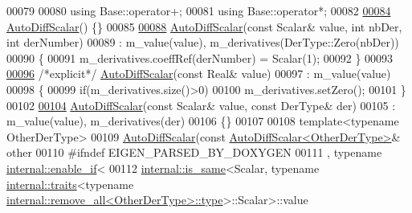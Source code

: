 \begin{DoxyCode}
00079 
00080     \textcolor{keyword}{using} Base::operator+;
00081     \textcolor{keyword}{using} Base::operator*;
00082 
\hyperlink{class_eigen_1_1_auto_diff_scalar_ae73d362745e986c00cee5658bf731412}{00084}     \hyperlink{class_eigen_1_1_auto_diff_scalar_ae73d362745e986c00cee5658bf731412}{AutoDiffScalar}() \{\}
00085 
\hyperlink{class_eigen_1_1_auto_diff_scalar_a7f4f44f682ba5d500c34c4f2fa6ecb9e}{00088}     \hyperlink{class_eigen_1_1_auto_diff_scalar_a7f4f44f682ba5d500c34c4f2fa6ecb9e}{AutoDiffScalar}(\textcolor{keyword}{const} Scalar& value, \textcolor{keywordtype}{int} nbDer, \textcolor{keywordtype}{int} derNumber)
00089       : m\_value(value), m\_derivatives(DerType::Zero(nbDer))
00090     \{
00091       m\_derivatives.coeffRef(derNumber) = Scalar(1);
00092     \}
00093 
\hyperlink{class_eigen_1_1_auto_diff_scalar_a14e0f5ecc595deb05aaf336f5a81b861}{00096}     \textcolor{comment}{/*explicit*/} \hyperlink{class_eigen_1_1_auto_diff_scalar_a14e0f5ecc595deb05aaf336f5a81b861}{AutoDiffScalar}(\textcolor{keyword}{const} Real& value)
00097       : m\_value(value)
00098     \{
00099       \textcolor{keywordflow}{if}(m\_derivatives.size()>0)
00100         m\_derivatives.setZero();
00101     \}
00102 
\hyperlink{class_eigen_1_1_auto_diff_scalar_a09641114cbb3b98a1132b82dff5939e3}{00104}     \hyperlink{class_eigen_1_1_auto_diff_scalar_a09641114cbb3b98a1132b82dff5939e3}{AutoDiffScalar}(\textcolor{keyword}{const} Scalar& value, \textcolor{keyword}{const} DerType& der)
00105       : m\_value(value), m\_derivatives(der)
00106     \{\}
00107 
00108     \textcolor{keyword}{template}<\textcolor{keyword}{typename} OtherDerType>
00109     \hyperlink{class_eigen_1_1_auto_diff_scalar}{AutoDiffScalar}(\textcolor{keyword}{const} \hyperlink{class_eigen_1_1_auto_diff_scalar}{AutoDiffScalar<OtherDerType>}& other
00110 #ifndef EIGEN\_PARSED\_BY\_DOXYGEN
00111     , \textcolor{keyword}{typename} \hyperlink{struct_eigen_1_1internal_1_1enable__if}{internal::enable\_if}<
00112             \hyperlink{struct_eigen_1_1internal_1_1is__same}{internal::is\_same}<Scalar, \textcolor{keyword}{typename} \hyperlink{struct_eigen_1_1internal_1_1traits}{internal::traits}<\textcolor{keyword}{typename} 
      \hyperlink{group___sparse_core___module}{internal::remove\_all<OtherDerType>::type}>::Scalar>::value

\end{DoxyCode}

